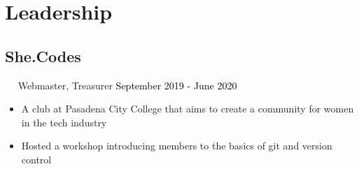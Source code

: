 \documentclass{article}
\newcommand{\resumesection}[3]{
    \subsection*{#1}
    \ 
    \ 
    \small
    \textcolor{csufgrey}{#2}
    \normalsize
    \hfill
    \textcolor{black}{#3}
    \normalsize
}
\begin{document}
\section*{Leadership}
\resumesection{She.Codes}{Webmaster, Treasurer}{September 2019 - June 2020}
\begin{itemize}
    \item A club at Pasadena City College that aims to create a community for women in the tech industry
    \item Hosted a workshop introducing members to the basics of git and version control
\end{itemize}
\hfill
\end{document}
